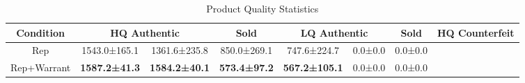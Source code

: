 \begin{table}[t]
    \centering
    \caption{Product Quality Statistics}
    \label{tab:rq1_product_quality}
    \begin{tabular}{ccccccc}
    \toprule
    \textbf{Condition} & \multicolumn{2}{c}{HQ Authentic} & \textbf{Sold} & \multicolumn{2}{c}{LQ Authentic} & \textbf{Sold} & \multicolumn{2}{c}{HQ Counterfeit} \\
    \midrule
    Rep & 1543.0±165.1 & 1361.6±235.8 & 850.0±269.1 & 747.6±224.7 & 0.0±0.0 & 0.0±0.0 \\
    Rep+Warrant & \textbf{1587.2±41.3} & \textbf{1584.2±40.1} & \textbf{573.4±97.2} & \textbf{567.2±105.1} & 0.0±0.0 & 0.0±0.0 \\
    \bottomrule
    \end{tabular}
\end{table}